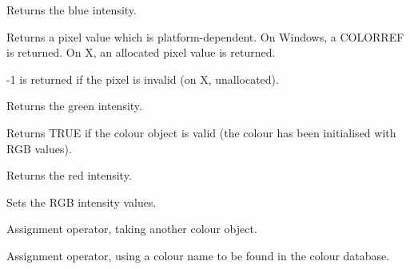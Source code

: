 
\label{wxcolourblue}


Returns the blue intensity.

\label{wxcolourgetpixel}


Returns a pixel value which is platform-dependent. On Windows, a COLORREF is returned.
On X, an allocated pixel value is returned.

-1 is returned if the pixel is invalid (on X, unallocated).

\label{wxcolourgreen}


Returns the green intensity.

\label{wxcolourok}


Returns TRUE if the colour object is valid (the colour has been initialised with RGB values).

\label{wxcolourred}


Returns the red intensity.

\label{wxcolourset}


Sets the RGB intensity values.

\label{wxcolourassign}


Assignment operator, taking another colour object.


Assignment operator, using a colour name to be found in the colour database.



\label{wxcolourequality}

